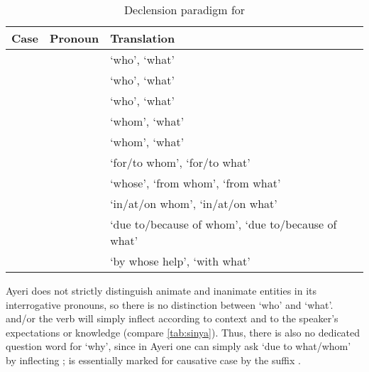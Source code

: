 \begin{table}[tp]\centering
\caption{Declension paradigm for }
\begin{tabu} to \linewidth {X[1] X[3] X[8]}
\tableheaderfont\toprule
Case
	& Pronoun
	& Translation
	\\

\toprule

\Top{}
	& 
	& `who', `what'
	\\

\midrule

\Aarg{}
	& 
	& `who', `what'
	\\

\AargI{}
	& 
	& `who', `what'
	\\
\Parg{}
	& 
	& `whom', `what'
	\\
\PargI{}
	& 
	& `whom', `what'
	\\
\Dat{}
	& 
	& `for/to whom', `for/to what'
	\\

\midrule

\Gen{}
	& 
	& `whose', `from whom', `from what'
	\\

\Loc{}
	& 
	& `in/at/on whom', `in/at/on what'
	\\

\Caus{}
	& 
	& `due to/because of whom', `due to/because of what'
	\\

\Ins{}
	& 
	& `by whose help', `with what'
	\\

\bottomrule
\end{tabu}
\label{tab:sinya}
\end{table}

Ayeri does not strictly distinguish animate and inanimate entities in its
interrogative pronouns, so there is no distinction between `who' and `what'.
 and/or the verb will simply inflect according to context and
to the speaker's expectations or knowledge (compare \autoref{tab:sinya}). Thus,
there is also no dedicated question word for `why', since in Ayeri one can
simply ask `due to what/whom' by inflecting ; 
 is essentially  marked for causative
case by the suffix .

